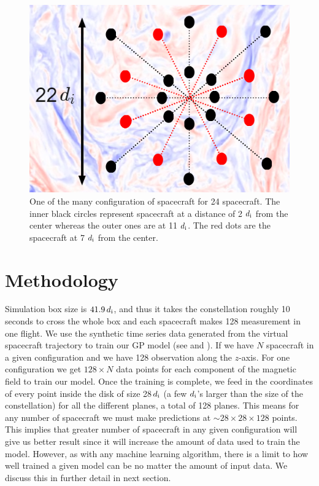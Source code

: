         \begin{figure}
            \begin{center}
                \includegraphics[width=1.\textwidth]{figures/chap8/spc_config_24.png}
                \caption[Configuration for 24 spacecraft]{One of the many configuration of
                spacecraft for 24 spacecraft. The inner black circles represent spacecraft at a
                distance of 2 $d_{\rm i}$ from the center whereas the outer ones are at 11 $d_{\rm
                i}$. The red dots are the spacecraft at 7 $d_{\rm i}$ from the center.}
                \label{fig:spc_conf}
            \end{center}
        \end{figure}

    \section{Methodology} \label{sec:method8}

        Simulation box size is $41.9\,d_{\rm i}$, and thus it takes the constellation roughly 10
        seconds to cross the whole box and each spacecraft makes 128 measurement in one flight. We
        use the synthetic time series data generated from the virtual spacecraft trajectory to train
        our GP model (see  and ). If we have $N$ spacecraft in a given
        configuration and we have 128 observation along the $z$-axis. For one configuration we get
        $128 \times N$ data points for each component of the magnetic field to train our model. Once
        the training is complete, we feed in the coordinates of every point inside the disk of size
        28\,$d_{\rm i}$ (a few $d_{\rm i}$'s larger than the size of the constellation) for all the
        different planes, a total of 128 planes. This means for any number of spacecraft we must
        make predictions at $\sim 28 \times 28 \times 128$ points. This implies that greater number
        of spacecraft in any given configuration will give us better result since it will increase
        the amount of data used to train the model. However, as with any machine learning algorithm,
        there is a limit to how well trained a given model can be no matter the amount of input
        data. We discuss this in further detail in next section.

